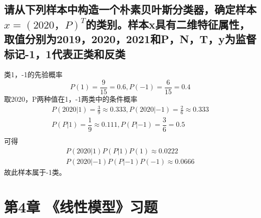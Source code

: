 \documentclass{ctexart}
\begin{document}
\subsection*{请从下列样本中构造一个朴素贝叶斯分类器，确定样本$x=(2020，P)^T$的类别。样本x具有二维特征属性，取值分别为{2019，2020，2021}和{P，N，T}，y为监督标记{-1，1}代表正类和反类}
\begin{table}[H]
\centering
{}
\end{table}
类1，-1的先验概率
\begin{equation*}
P(1)=\frac{9}{15}=0.6,P(-1)=\frac{6}{15}=0.4
\end{equation*}
取2020，P两种值在1，-1两类中的条件概率
\begin{gather*}
P(2020|1)=\frac{3}{9}\approx0.333,P(2020|-1)=\frac{2}{6}\approx0.333\\
P(P|1)=\dfrac{1}{9}\approx0.111,P(P|-1)=\dfrac{3}{6}=0.5\\
\end{gather*}
可得
\begin{gather*}
P(2020|1)P(P|1)P(1)\approx0.0222\\
P(2020|-1)P(P|-1)P(-1)\approx0.0666
\end{gather*}
故此样本属于-1类。

\newpage
\section*{第4章 《线性模型》习题}
\end{document}
